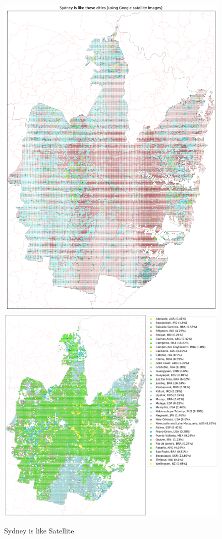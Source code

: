 \documentclass[final,3p,times,authoryear]{elsarticle}
\begin{document}
\begin{figure}[!htbp]
\centering    
\includegraphics[scale=0.25]{Images/SydneyOverall_sat.png} 
\includegraphics[scale=0.25]{Images/SydneyOverallAbrev_sat.png} 
\caption{Sydney is like Satellite}    
 \label{fig:sydmaps}  
\end{figure} 
\end{document}
